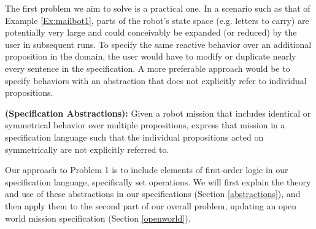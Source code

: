 The first problem we aim to solve is a practical one. In a scenario such as that of Example \ref{Ex:mailbot1}, parts of the robot's state space (e.g. letters to carry) are potentially very large and could conceivably be expanded (or reduced) by the user in subsequent runs. To specify the same reactive behavior over an additional proposition in the domain, the user would have to modify or duplicate nearly every sentence in the specification. A more preferable approach would be to specify behaviors with an abstraction that does not explicitly refer to individual propositions.

\begin{myProblem}\label{Prop:groups}
	\textbf{(Specification Abstractions):}
	Given a robot mission that includes identical or symmetrical behavior over multiple propositions, express that mission in a specification language such that the individual propositions acted on symmetrically are not explicitly referred to. 
\end{myProblem}

Our approach to Problem 1 is to include elements of first-order logic in our specification language, specifically set operations. We will first explain the theory and use of these abstractions in our specifications (Section \ref{abstractions}), and then apply them to the second part of our overall problem, updating an open world mission specification (Section \ref{openworld}). 

